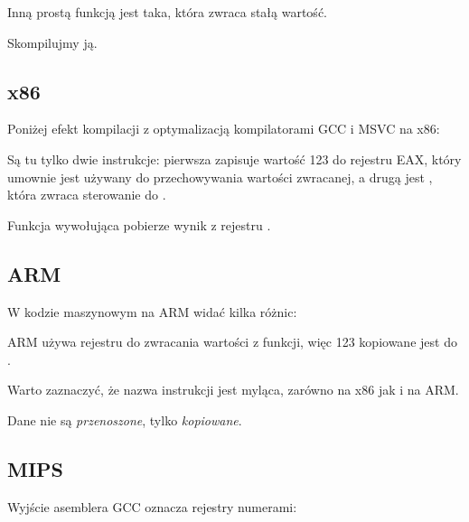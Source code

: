 \label{ret_val_func}

Inną prostą funkcją jest taka, która zwraca stałą wartość.



Skompilujmy ją.

\subsection{x86}

Poniżej efekt kompilacji z optymalizacją kompilatorami GCC i MSVC na x86:



Są tu tylko dwie instrukcje: pierwsza zapisuje wartość 123 do rejestru EAX,
który umownie jest używany do przechowywania wartości zwracanej,
a drugą jest \RET, która zwraca sterowanie do .

Funkcja wywołująca pobierze wynik z rejestru \EAX.

\subsection{ARM}

W kodzie maszynowym na ARM widać kilka różnic:



ARM używa rejestru  do zwracania wartości z funkcji, więc 123 kopiowane jest do .

Warto zaznaczyć, że nazwa instrukcji \MOV jest myląca, zarówno na x86 jak i na ARM.

Dane nie są \emph{przenoszone}, tylko \emph{kopiowane}.

\subsection{MIPS}

\label{MIPS_leaf_function_ex1}

Wyjście asemblera GCC oznacza rejestry numerami:



